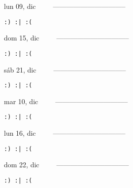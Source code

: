 \documentclass[letterpaper,10pt]{article}
\begin{document}
\begin{multicols}{3}
{lun 09, dic\ \ \ \ \ --------------------------------}
\begin{flushright}\begin{small}\texttt{:) :| :(}\end{small}\end{flushright}
\vfill
{dom 15, dic\ \ \ \ \ --------------------------------}
\begin{flushright}\begin{small}\texttt{:) :| :(}\end{small}\end{flushright}\par
\vfill
{sáb 21, dic\ \ \ \ \ --------------------------------}
\begin{flushright}\begin{small}\texttt{:) :| :(}\end{small}\end{flushright}\par
\vfill
\end{multicols}
\vspace{1.05cm}

\begin{multicols}{3}
{mar 10, dic\ \ \ \ \ --------------------------------}
\begin{flushright}\begin{small}\texttt{:) :| :(}\end{small}\end{flushright}
\vfill
{lun 16, dic\ \ \ \ \ --------------------------------}
\begin{flushright}\begin{small}\texttt{:) :| :(}\end{small}\end{flushright}\par
\vfill
{dom 22, dic\ \ \ \ \ --------------------------------}
\begin{flushright}\begin{small}\texttt{:) :| :(}\end{small}\end{flushright}\par
\vfill
\end{multicols}
\vspace{1.05cm}
\end{document}
